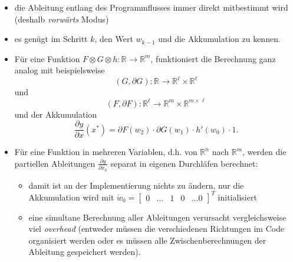 \documentclass[
]{book}
\providecommand{\tightlist}{%
  \setlength{\itemsep}{0pt}\setlength{\parskip}{0pt}}
\theoremstyle{definition}
\theoremstyle{definition}
\theoremstyle{definition}
\theoremstyle{definition}
\theoremstyle{remark}
\begin{document}
\begin{itemize}
\tightlist
\item
  die Ableitung entlang des Programmflusses immer direkt mitbestimmt wird
  (deshalb \emph{vorwärts} Modus)
\item
  es genügt im Schritt \(k\), den Wert \(w_{k-1}\) und die Akkumulation zu
  kennen.
\item
  Für eine Funktion \(F\otimes G \otimes h \colon \mathbb R^{}\to \mathbb R^{m}\), funktioniert die Berechnung ganz analog mit beispielsweise
  \begin{equation*}
  (G, \partial G) \colon \mathbb R^{} \to \mathbb R^{\ell} \times  \mathbb R^{\ell}
  \end{equation*}
  und
  \begin{equation*}
  (F, \partial F) \colon \mathbb R^{\ell} \to \mathbb R^{m} \times  \mathbb
  R^{m \times \ell}
  \end{equation*}
  und der Akkumulation
  \begin{equation*}
  \frac{\partial y}{\partial x}(x^*) = \partial F(w_2)\cdot \partial G(w_1)\cdot h'(w_0) \cdot 1.
  \end{equation*}
\item
  Für eine Funktion in mehreren Variablen, d.h. von \(\mathbb R^{n}\) nach \(\mathbb R^{m}\), werden die
  partiellen Ableitungen \(\frac{\partial y}{\partial x_k}\) separat in eigenen Durchläfen berechnet:

  \begin{itemize}
  \tightlist
  \item
    damit ist an der Implementierung nichts zu ändern, nur die
    Akkumulation wird mit \(\dot w_0 = \begin{bmatrix} 0 & \hdots & 1 & 0 & \hdots 0 \end{bmatrix}^T\) initialisiert
  \item
    eine simultane Berechnung aller Ableitungen verursacht vergleichsweise
    viel \emph{overhead} (entweder müssen die verschiedenen Richtungen im
    Code
    organisiert werden oder es müssen alle Zwischenberechnungen der
    Ableitung gespeichert werden).
  \end{itemize}
\end{itemize}
\end{document}
